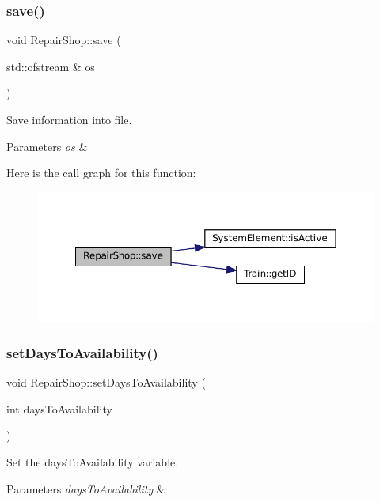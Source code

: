 \subsubsection{\texorpdfstring{save()}{save()}}
{\footnotesize\ttfamily void Repair\+Shop\+::save (\begin{DoxyParamCaption}\item[{std\+::ofstream \&}]{os }\end{DoxyParamCaption})}

Save information into file.


\begin{DoxyParams}{Parameters}
{\em os} & \\
\hline
\end{DoxyParams}
Here is the call graph for this function\+:
\nopagebreak
\begin{figure}[H]
\begin{center}
\leavevmode
\includegraphics[width=350pt]{classRepairShop_adb1e3f82716bac189d0f91ce9b9fd74e_cgraph}
\end{center}
\end{figure}
\mbox{\label{classRepairShop_af212410041d7bc7486e1eaa27864f527}} 
\subsubsection{\texorpdfstring{set\+Days\+To\+Availability()}{setDaysToAvailability()}}
{\footnotesize\ttfamily void Repair\+Shop\+::set\+Days\+To\+Availability (\begin{DoxyParamCaption}\item[{int}]{days\+To\+Availability }\end{DoxyParamCaption})}

Set the days\+To\+Availability variable.


\begin{DoxyParams}{Parameters}
{\em days\+To\+Availability} & \\
\hline
\end{DoxyParams}
\mbox{\label{classRepairShop_ab3b24779f3d3bf3b9e9a70f1a4cb78c5}} 
